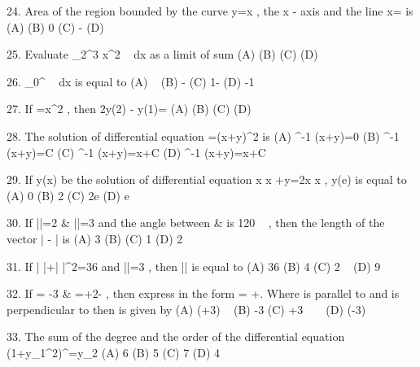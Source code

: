 24. Area of the region bounded by the curve y=\tan x , the x - axis and the line x= is
(A)  \qquad \qquad \qquad \qquad \qquad \quad (B) 0
(C) - \qquad \qquad \qquad \qquad \qquad (D) \log {}

25. Evaluate \int_{2}^{3} x^2 ~ dx as a limit of sum
(A)  \qquad \qquad \qquad \qquad \qquad (B) 
(C)  \qquad \qquad \qquad \qquad \qquad (D) 

26. \int_{0}^{}  ~ dx is equal to
(A)  \qquad \qquad \qquad \qquad \quad ~ (B) -
(C) 1- \qquad \qquad \qquad \qquad (D) -1

27. If =x^2 , then 2y(2) - y(1)=
(A)  \qquad \qquad \qquad \qquad \qquad (B) 
(C)  \qquad \qquad \qquad \qquad \qquad (D) 

28. The solution of differential equation =(x+y)^2 is
(A) \tan^{-1} (x+y)=0 \qquad \qquad \qquad \qquad \qquad (B) \cot^{-1} (x+y)=C
(C) \cot^{-1} (x+y)=x+C \qquad \qquad \qquad \qquad (D) \tan^{-1} (x+y)=x+C

29. If y(x) be the solution of differential equation x \log x +y=2x \log x , y(e) is equal to
(A) 0 \qquad \qquad \qquad \qquad \qquad (B) 2
(C) 2e \qquad \qquad \qquad \qquad \qquad (D) e

30. If ||=2 & ||=3 and the angle between  &  is 120 ~ \mathring{} , then the length of the vector \left|  - \right| is
(A) 3 \qquad \qquad \qquad \qquad \qquad (B) 
(C) 1 \qquad \qquad \qquad \qquad \qquad (D) 2

31. If | \times {}|+| \cdot {}|^2=36 and ||=3 , then || is equal to
(A) 36 \qquad \qquad \qquad \qquad \qquad (B) 4
(C) 2 \qquad \qquad \qquad \qquad \qquad ~ (D) 9

32. If \vec{\alpha}= -3 & \vec{\beta}=+2- , then express \vec{\beta} in the form \vec{\beta}= +. Where  is parallel to  and  is perpendicular to \vec{\alpha} then  is given by
(A) (+3) \qquad \qquad \qquad \qquad \qquad ~ (B) -3
(C) +3 \qquad \qquad \qquad \qquad \qquad \quad ~ ~ (D) (-3)

33. The sum of the degree and the order of the differential equation (1+y_{1}^{2})^{}=y_2
(A) 6 \qquad \qquad \qquad \qquad \qquad (B) 5
(C) 7 \qquad \qquad \qquad \qquad \qquad (D) 4

